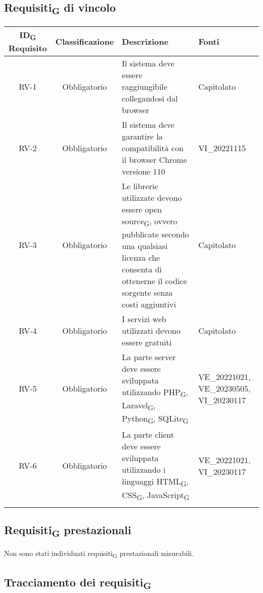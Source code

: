 \subsection{Requisiti\textsubscript{G} di vincolo}
\setlength\extrarowheight{5pt}
\begin{tabularx}{\textwidth}{| c | c | X | X |} 
 \hline
 \rowcolor{white}
 \textbf{ID\textsubscript{G} Requisito} & \textbf{Classificazione} & \textbf{Descrizione} & \textbf{Fonti} \\
 \hline
 RV-1 & Obbligatorio &  Il sistema deve essere raggiungibile collegandosi dal browser & Capitolato\\
 \hline
  RV-2 & Obbligatorio & Il sistema deve garantire la compatibilità con il browser Chrome versione 110 & VI\_20221115\\
 \hline
 RV-3 & Obbligatorio &  Le librerie utilizzate devono essere open source\textsubscript{G}, ovvero pubblicate secondo una qualsiasi licenza che consenta di ottenerne il codice sorgente senza costi aggiuntivi & Capitolato\\
 \hline
 RV-4 & Obbligatorio & I servizi web utilizzati devono essere gratuiti &  Capitolato\\
 \hline
 RV-5 & Obbligatorio & La parte server deve essere sviluppata utilizzando PHP\textsubscript{G}, Laravel\textsubscript{G}, Python\textsubscript{G},  SQLite\textsubscript{G} & 
 VE\_20221021, VE\_20230505, VI\_20230117\\
 \hline
 RV-6 & Obbligatorio & La parte client deve essere sviluppata utilizzando i linguaggi HTML\textsubscript{G}, CSS\textsubscript{G}, JavaScript\textsubscript{G} & VE\_20221021, VI\_20230117\\
 \hline
 \rowcolor{white}
 \caption{Requisiti\textsubscript{G} di vincolo}
\end{tabularx}

\subsection{Requisiti\textsubscript{G} prestazionali}
Non sono stati individuati requisiti\textsubscript{G} prestazionali misurabili.
\subsection{Tracciamento dei requisiti\textsubscript{G}}
